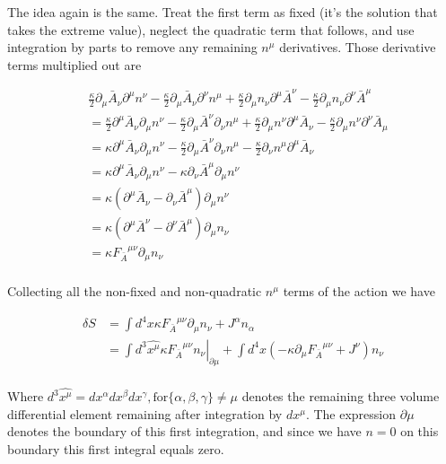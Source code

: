 \documentclass{article}
\newcommand{\barA}[0]{\bar{A}}
\begin{document}
The idea again is the same.  Treat the first term as fixed (it's the solution that takes the extreme value), neglect the quadratic term that follows, and use integration by parts
to remove any remaining $n^{\mu}$ derivatives.  Those derivative terms multiplied out are

\begin{align*}
& \frac{\kappa}{2} \partial_{\mu} \barA_{\nu} \partial^{\mu} n^{\nu}
- \frac{\kappa}{2} \partial_{\mu} \barA_{\nu} \partial^{\nu} n^{\mu}
+ \frac{\kappa}{2} \partial_{\mu} n_{\nu} \partial^{\mu} \barA^{\nu}
- \frac{\kappa}{2} \partial_{\mu} n_{\nu} \partial^{\nu} \barA^{\mu} \\
&= \frac{\kappa}{2} \partial^{\mu} \barA_{\nu} \partial_{\mu} n^{\nu}
- \frac{\kappa}{2} \partial_{\mu} \barA^{\nu} \partial_{\nu} n^{\mu}
+ \frac{\kappa}{2} \partial_{\mu} n^{\nu} \partial^{\mu} \barA_{\nu}
- \frac{\kappa}{2} \partial_{\mu} n^{\nu} \partial^{\nu} \barA_{\mu} \\
&= \kappa \partial^{\mu} \barA_{\nu} \partial_{\mu} n^{\nu}
- \frac{\kappa}{2} \partial_{\mu} \barA^{\nu} \partial_{\nu} n^{\mu}
- \frac{\kappa}{2} \partial_{\nu} n^{\mu} \partial^{\mu} \barA_{\nu} \\
&= \kappa \partial^{\mu} \barA_{\nu} \partial_{\mu} n^{\nu}
- \kappa \partial_{\nu} \barA^{\mu} \partial_{\mu} n^{\nu} \\
&= \kappa \left( \partial^{\mu} \barA_{\nu} -\partial_{\nu} \barA^{\mu} \right) \partial_{\mu} n^{\nu} \\
&= \kappa \left( \partial^{\mu} \barA^{\nu} -\partial^{\nu} \barA^{\mu} \right) \partial_{\mu} n_{\nu} \\
&= \kappa {F_{\barA}}^{\mu\nu} \partial_{\mu} n_{\nu} \\
\end{align*}

Collecting all the non-fixed and non-quadratic $n^{\mu}$ terms of the action we have

\begin{align*}
\delta S 
&= \int d^4 x \kappa {F_{\barA}}^{\mu\nu} \partial_{\mu} n_{\nu} + J^{\alpha} n_{\alpha} \\
&= \int \left. d^3 \widehat{x^{\mu}} \kappa {F_{\barA}}^{\mu\nu} n_{\nu} \right\vert_{\partial \mu}
 + \int d^4 x \left( 
- \kappa \partial_{\mu} {F_{\barA}}^{\mu\nu} + J^{\nu}
\right) n_{\nu} \\
\end{align*}

Where $d^3 \widehat{x^{\mu}} = dx^\alpha dx^\beta dx^\gamma, \text{for} \{\alpha, \beta, \gamma\} \ne \mu$ denotes the remaining three volume differential element remaining after integration by $dx^{\mu}$.  The expression $\partial \mu$ denotes the boundary of this first integration, and since we have $n=0$ on this boundary this first integral equals zero.
\end{document}
